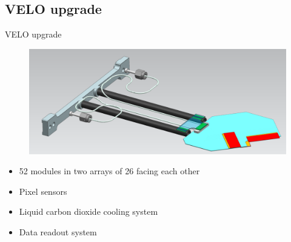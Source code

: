 \documentclass{beamer}
\begin{document}
\subsection{VELO upgrade}
\begin{frame}{VELO upgrade}
  \begin{figure}
    \begin{center}
      \includegraphics[height=0.3\textheight]{figs/module}
    \end{center}
    \vspace*{-0.5cm}
  \end{figure}
  \begin{itemize}
    \item
      52 modules in two arrays of 26 facing each other
    \item
      Pixel sensors
    \item
      Liquid carbon dioxide cooling system
    \item
      Data readout system
  \end{itemize}
\end{frame}
\end{document}

